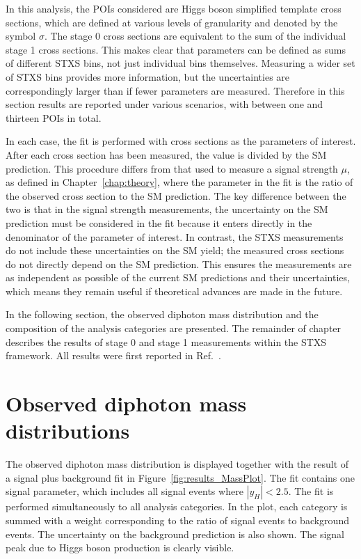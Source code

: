 In this analysis, the POIs considered are Higgs boson simplified template cross sections, 
which are defined at various levels of granularity and denoted by the symbol $\sigma$.
The stage 0 cross sections are equivalent 
to the sum of the individual stage 1 cross sections.
This makes clear that parameters can be defined as sums of different STXS bins, 
not just individual bins themselves.
Measuring a wider set of STXS bins provides more information, 
but the uncertainties are correspondingly larger than if fewer parameters are measured.
Therefore in this section results are reported under various scenarios, 
with between one and thirteen POIs in total.

In each case, the fit is performed with cross sections as the parameters of interest.
After each cross section has been measured, the value is divided by the SM prediction. 
This procedure differs from that used to measure a signal strength $\mu$, 
as defined in Chapter~\ref{chap:theory},
where the parameter in the fit is the ratio of the observed cross section to the SM prediction.
The key difference between the two is that in the signal strength measurements,
the uncertainty on the SM prediction must be considered in the fit
because it enters directly in the denominator of the parameter of interest.
In contrast, the STXS measurements do not include these uncertainties on the SM yield;
the measured cross sections do not directly depend on the SM prediction.
This ensures the measurements are as independent as possible of the current SM predictions
and their uncertainties, 
which means they remain useful if theoretical advances are made in the future.

In the following section, the observed diphoton mass distribution
and the composition of the analysis categories are presented.
The remainder of chapter describes the results of stage 0 and stage 1 measurements 
within the STXS framework.
All results were first reported in Ref.~\cite{HIG-18-029}.

\section{Observed diphoton mass distributions}

The observed diphoton mass distribution is displayed together with the result 
of a signal plus background fit in Figure~\ref{fig:results_MassPlot}.
The fit contains one signal parameter, 
which includes all signal events where $|y_H| < 2.5$.
The fit is performed simultaneously to all analysis categories.
In the plot, each category is summed with a weight 
corresponding to the ratio of signal events to background events. %
The uncertainty on the background prediction is also shown.
The signal peak due to Higgs boson production is clearly visible.

